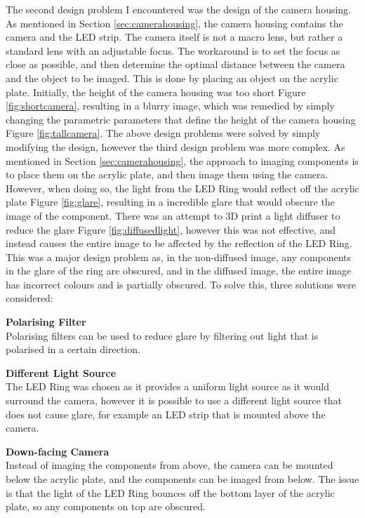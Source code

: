 The second design problem I encountered was the design of the camera housing. As mentioned in Section \ref*{sec:camerahousing}, the camera housing contains the camera and the LED strip.
The camera itself is not a macro lens, but rather a standard lens with an adjustable focus. The workaround is to set the focus as close as possible, and then determine the optimal
distance between the camera and the object to be imaged. This is done by placing an object on the acrylic plate. Initially, the height of the camera housing was too short Figure \ref*{fig:shortcamera}, resulting in a 
blurry image, which was remedied by simply changing the parametric parameters that define the height of the camera housing Figure \ref*{fig:tallcamera}. 
The above design problems were solved by simply modifying the design, however the third design problem was more complex. As mentioned in Section \ref*{sec:camerahousing}, the approach 
to imaging components is to place them on the acrylic plate, and then image them using the camera. However, when doing so, the light from the LED Ring would reflect off the acrylic plate Figure \ref*{fig:glare},
resulting in a incredible glare that would obscure the image of the component. There was an attempt to 3D print a light diffuser to reduce the glare Figure \ref*{fig:diffusedlight}, however this was not effective, and instead
causes the entire image to be affected by the reflection of the LED Ring. This was a major design problem as, in the non-diffused image, any components in the glare of the ring are obscured, and in the diffused image,
the entire image has incorrect colours and is partially obscured. To solve this, three solutions were considered:
\begin{mylist}
  \item \textbf{Polarising Filter} \\
  Polarising filters can be used to reduce glare by filtering out light that is polarised in a certain direction.
  \item \textbf{Different Light Source} \\
  The LED Ring was chosen as it provides a uniform light source as it would surround the camera, however it is possible to use a different light source that does not cause glare, for example
  an LED strip that is mounted above the camera.
  \item \textbf{Down-facing Camera} \\
  Instead of imaging the components from above, the camera can be mounted below the acrylic plate, and the components can be imaged from below.
  The issue is that the light of the LED Ring bounces off the bottom layer of the acrylic plate, so any components on top are obscured.
\end{mylist}
  
